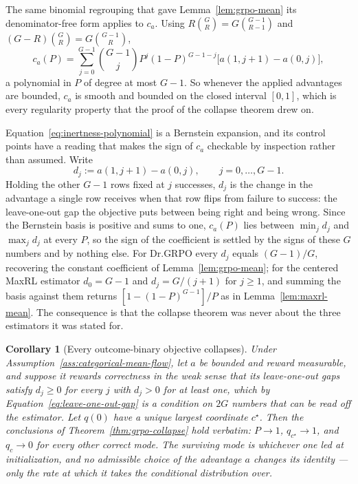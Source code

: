 \documentclass{article}
\newcommand{\1}{\mathbf 1}
\newtheorem{corollary}[lemma]{Corollary}
\theoremstyle{remark}
\theoremstyle{definition}
\theoremstyle{plain}
\begin{document}
The same binomial regrouping that gave Lemma~\ref{lem:grpo-mean} its
denominator-free form applies to $c_a$. Using $R\binom GR=G\binom{G-1}{R-1}$
and $(G-R)\binom GR=G\binom{G-1}{R}$,
\begin{equation}
 c_a(P)=\sum_{j=0}^{G-1}\binom{G-1}{j}P^j(1-P)^{G-1-j}
 \big[a(1,j+1)-a(0,j)\big],
 \label{eq:inertness-polynomial}
\end{equation}
a polynomial in $P$ of degree at most $G-1$. So whenever the applied advantages
are bounded, $c_a$ is smooth and bounded on the closed interval $[0,1]$, which
is every regularity property that the proof of the collapse theorem drew on.

Equation~\eqref{eq:inertness-polynomial} is a Bernstein expansion, and its
control points have a reading that makes the sign of $c_a$ checkable by
inspection rather than assumed. Write
\begin{equation}
 d_j:=a(1,j+1)-a(0,j),\qquad j=0,\ldots,G-1 .
 \label{eq:leave-one-out-gap}
\end{equation}
Holding the other $G-1$ rows fixed at $j$ successes, $d_j$ is the change in the
advantage a single row receives when that row flips from failure to success:
the leave-one-out gap the objective puts between being right and being wrong.
Since the Bernstein basis is positive and sums to one, $c_a(P)$ lies between
$\min_jd_j$ and $\max_jd_j$ at every $P$, so the sign of the coefficient is
settled by the signs of these $G$ numbers and by nothing else.
For Dr.GRPO every $d_j$ equals $(G-1)/G$, recovering the constant coefficient
of Lemma~\ref{lem:grpo-mean}; for the centered MaxRL estimator $d_0=G-1$ and
$d_j=G/(j+1)$ for $j\ge1$, and summing the basis against them returns
$[1-(1-P)^{G-1}]/P$ as in Lemma~\ref{lem:maxrl-mean}. The consequence is that
the collapse theorem was never about the three estimators it was stated for.

\begin{corollary}[Every outcome-binary objective collapses]
\label{cor:class-collapse}
Under Assumption~\ref{ass:categorical-mean-flow}, let $a$ be bounded and
reward measurable, and suppose it rewards correctness in the weak sense that
its leave-one-out gaps satisfy $d_j\ge0$ for every $j$ with $d_j>0$ for at
least one, which by Equation~\eqref{eq:leave-one-out-gap} is a condition on
$2G$ numbers that can be read off the estimator. Let $q(0)$ have a unique
largest coordinate $c^\star$. Then the conclusions of Theorem~\ref{thm:grpo-collapse}
hold verbatim: $P\to1$, $q_{c^\star}\to1$, and $q_c\to0$ for every other
correct mode. The surviving mode is whichever one led at initialization, and
no admissible choice of the advantage $a$ changes its identity --- only the
rate at which it takes the conditional distribution over.
\end{corollary}
\end{document}
